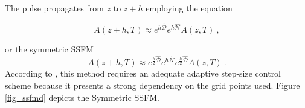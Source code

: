         The pulse propagates from $z$ to $z+h$ employing the equation 
        
        \begin{equation}\label{eq_azh}
            A(z+h, T) \approx e^{h\hat{\mathcal{D}}} e^{h\hat{\mathcal{N}}} A(z,T) \ ,
        \end{equation}
        
        or the symmetric SSFM \citep{sinkin}
        \begin{equation}\label{eq_azh2}
            A(z+h, T) \approx e^{\frac{h}{2}\hat{\mathcal{D}}} e^{h\hat{\mathcal{N}}} e^{\frac{h}{2}\hat{\mathcal{D}}} A(z,T) \ .
        \end{equation} According to \citep{Balac2013OverviewOA}, this method requires an adequate adaptive step-size control scheme because it presents a strong dependency on the grid points used. Figure \ref{fig_ssfmd} depicts the Symmetric SSFM.
        
        
        
